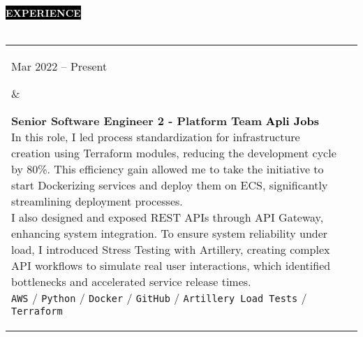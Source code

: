\documentclass[10pt,A4]{article}
\makeatletter
\newcounter{a}
\newcounter{b}
\newcounter{c}
\newcommand{\cvsection}[1] {
	\textcolor{white}{\MakeUppercase{\textbf{#1}}}
}
\newcommand{\cvsect}[1]{
	\colorbox{black}{{\cvsection{#1}}}\\\\%
}
\newenvironment{entrylist}{%
	\begin{tabular*}{\textwidth}[t]{@{\extracolsep{\fill}}ll}
	}{%
	\end{tabular*}
}
\newcommand{\entry}[4]{%
	\parbox[t]{3.5cm}{%
		#1%
	}%
	&\parbox[t]{14cm}{%
		\textbf{#2}%
		\hfill%
		{\footnotesize \textbf{\textcolor{black}{#3}}}\\%
		#4%
	}\\\\}
\newcommand{\slashsep}{
	\hspace{2mm}/\hspace{2mm}
}
\makeatother
\begin{document}
	\cvsect{Experience}
	\begin{entrylist}
		\entry
		{Mar 2022 – Present}
		{Senior Software Engineer 2 - Platform Team}
		{Apli Jobs} %
		{In this role, I led process standardization for infrastructure creation using Terraform modules,
		reducing the development cycle by 80\%. This efficiency gain allowed me to take the initiative to
		start Dockerizing services and deploy them on ECS, significantly streamlining deployment processes.\\
		\hfil\break
		I also designed and exposed REST APIs through API Gateway, enhancing system integration. To ensure
		system reliability under load, I introduced Stress Testing with Artillery, creating complex API
		workflows to simulate real user interactions, which identified bottlenecks and accelerated service
		release times.\\
			\texttt{AWS}\slashsep\texttt{Python}\slashsep\texttt{Docker}\slashsep\texttt{GitHub}\slashsep\texttt{Artillery Load Tests}\slashsep\texttt{Terraform}}
		\entry
		{Jan 2022 – Mar 2022}
		{Software Engineer - Cloud Team}
		{Apli Jobs}
		{As the first and only Cloud Engineer during my initial 6 months at Apli, I spearheaded the design
		and implementation of cloud-based architecture for cross-team projects, collaborating with Data Science,
		Product, and Engineering teams. Utilizing AWS services such as EMR, ECS, DynamoDB, Lambda, AWS Backup,
		RDS, and Redis, I also successfully implemented cost optimization mechanisms that reduced the company's
		costs in around 10\% for the first year.\\
		\hfil\break
		I initiated and led internal efforts to bolster company culture and enforce security protocols.
		I was a key member of the committee that introduced the on-call program to the Engineering team, which
		resulted in a response time against incident of less than 4 hours. I also led the ISO audit and
		certification process, focusing on ensuring our architecture met the highest standards of security, 
		scalability, and reliability, which culminated in achieving ISO 27k1.\\
		\hfil\break
		As the team expanded, I took on a mentor and leadership role, establishing processes that improved
		code quality, including enhanced documentation, automated security checks in CI/CD, and regular
		knowledge-sharing meetings.\\
			\texttt{AWS}\slashsep\texttt{Python}\slashsep\texttt{Docker}\slashsep\texttt{GitHub}\slashsep\texttt{Terraform}\slashsep\texttt{GCP}}

\end{entrylist}
\end{document}
